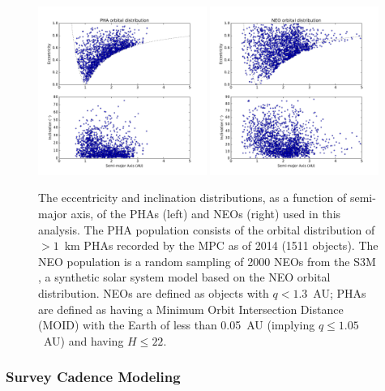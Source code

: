 \begin{figure}[t!]
\centering
\includegraphics[width=0.49\textwidth]{figures/pha20141031_orbits}
\includegraphics[width=0.49\textwidth]{figures/neos_2k_orbits}
\vskip -0.2in
\caption{The eccentricity and inclination distributions, as a function of semi-major axis, of the PHAs (left) and NEOs (right) used in this analysis. The PHA population consists of the orbital distribution of $>1$~km PHAs recorded by the MPC as of 2014 (1511 objects). The NEO population is a random sampling of 2000 NEOs from the S3M \citep{Grav2011}, a synthetic solar system model based on the \cite{Bottke2002} NEO orbital distribution. NEOs are defined as objects with $q<1.3$~AU; PHAs are defined as having a Minimum Orbit Intersection Distance (MOID) with the Earth of less than 0.05~AU (implying $q\le1.05$~AU) and having $H\le22$.  \label{fig:PHA_orbits}}
\end{figure}

\subsubsection{Survey Cadence Modeling}

